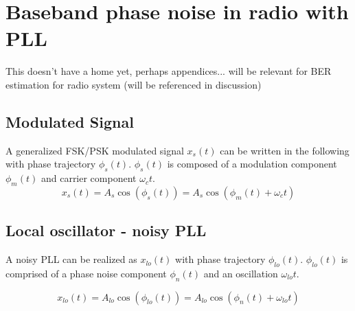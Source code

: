 	\section{Baseband phase noise in radio with PLL}
		This doesn't have a home yet, perhaps appendices... will be relevant for BER estimation for radio system (will be referenced in discussion)

	\subsection{Modulated Signal}
		A generalized FSK/PSK modulated signal $x_s(t)$ can be written in the following with phase trajectory $\phi_s(t)$. $\phi_s(t)$ is composed of a modulation component $\phi_m(t)$ and carrier component $\omega_ct$.
		\begin{equation}
			x_s(t) = A_s\cos(\phi_s(t)) = A_s\cos(\phi_m(t)+\omega_ct)
		\end{equation} 

	\subsection{Local oscillator - noisy PLL}
		A noisy PLL can be realized as $x_{lo}(t)$ with phase trajectory $\phi_{lo}(t)$. $\phi_{lo}(t)$ is comprised of a phase noise component $\phi_{n}(t)$ and an oscillation $\omega_{lo}t$. 

		\begin{equation}
			x_{lo}(t)  = A_{lo}\cos(\phi_{lo}(t)) = A_{lo}\cos(\phi_n(t)+\omega_{lo}t)
		\end{equation} 

